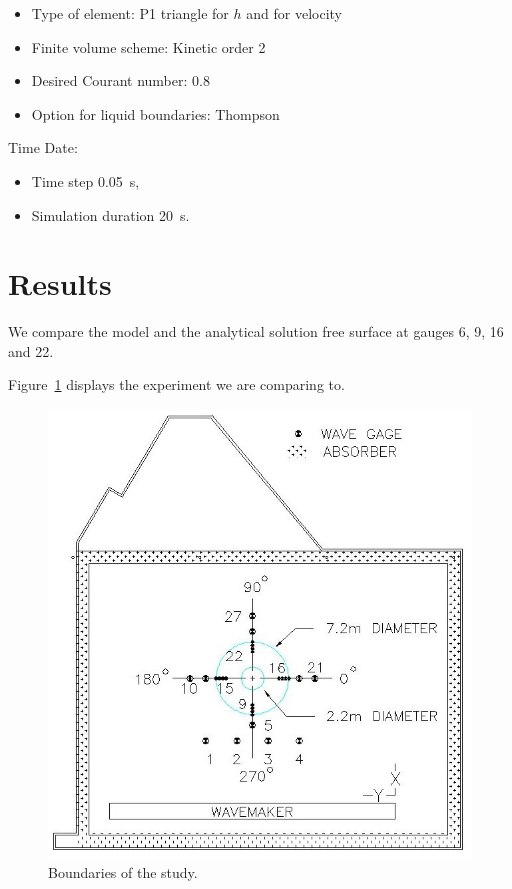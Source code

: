 \begin{itemize}
\item Type of element: P1 triangle for $h$ and for velocity
\item Finite volume scheme: Kinetic order 2
\item Desired Courant number: 0.8
\item Option for liquid boundaries: Thompson
\end{itemize}

Time Date:
\begin{itemize}
\item Time step 0.05~s,
\item Simulation duration 20~s.
\end{itemize}

\section{Results}

We compare the model and the analytical solution free surface at gauges 6, 9, 16 and 22.

Figure~\ref{fig:island:exp} displays the experiment we are comparing to.
\begin{figure}[H]
\centering
\includegraphics[width=.6\textwidth]{img/experiment.jpg}
  \caption{Boundaries of the study.}\label{fig:island:exp}
\end{figure}

